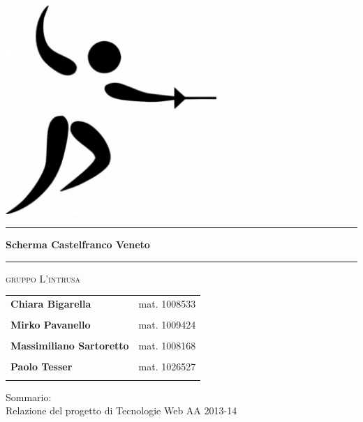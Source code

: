 \begin{titlepage}
 \begin{center}
     \includegraphics[width=8cm]{images/page_logo.png}\\
     
     \vspace{3em} \hrule \vspace{2em}
     {\LARGE \LARGE \LARGE \textbf{Scherma Castelfranco Veneto}}\\
     \vspace{2em} \hrule \vspace{2em}
     \vspace{2em}
 \end{center}

\begin{center}
	{\LARGE { \scshape gruppo L'intrusa}}\\
	\vspace{2em}
    \begin{tabular}{ R{5cm} | L{5cm}  }
    \textbf{Chiara Bigarella} & mat. 1008533\\ \\
    \textbf{Mirko Pavanello} & mat. 1009424 \\ \\
    \textbf{Massimiliano Sartoretto} & mat. 1008168 \\ \\
    \textbf{Paolo Tesser} &  mat. 1026527 \\ \\
    \end{tabular}
\end{center}

\vskip 0.7cm
\begin{center}
Sommario: \\Relazione del progetto di Tecnologie Web AA 2013-14\\
\end{center}
\end{titlepage}
\newpage
